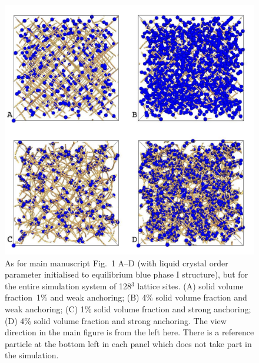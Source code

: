 \documentclass[12pt,twoside]{article}
\begin{document}
\begin{figure}[h]
\begin{center}
\includegraphics[scale=0.35]{support-fig2.pdf}
\end{center}
\caption{As for main manuscript Fig.~1 A--D
(with liquid crystal order parameter
initialised to equilibrium blue phase I structure), but for the entire
simulation system of 128$^3$ lattice sites. (A)  solid volume fraction~1\%
and weak anchoring;  (B) 4\% solid volume fraction and weak anchoring;
(C) 1\% solid volume fraction and strong anchoring; (D) 4\% solid
volume fraction and strong anchoring. The view direction in the
main figure is from the left here. There is a reference
particle at the bottom left in each panel which does not take part
in the simulation.}
\end{figure}
\end{document}
